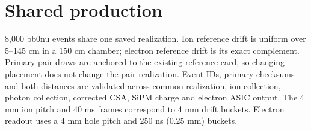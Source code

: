 \documentclass[11pt,a4paper]{article}
\begin{document}
\begin{center}\end{center}
\begin{center}\end{center}
\section*{Shared production}
8,000 bb0nu events share one saved realization. Ion reference drift is uniform over 5--145 cm in a 150 cm chamber; electron reference drift is its exact complement. Primary-pair draws are anchored to the existing reference card, so changing placement does not change the pair realization. Event IDs, primary checksums and both distances are validated across common realization, ion collection, photon collection, corrected CSA, SiPM charge and electron ASIC output. The 4 mm ion pitch and 40 ms frames correspond to 4 mm drift buckets. Electron readout uses a 4 mm hole pitch and 250 ns (0.25 mm) buckets.
\end{document}
